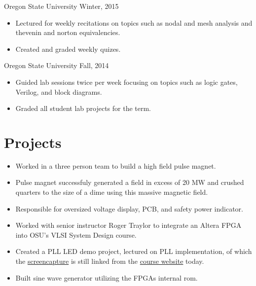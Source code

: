 \documentclass[]{friggeri-cv}
\begin{document}
         {Oregon State University}
         {Winter, 2015}
         \begin{itemize}
           \item Lectured for weekly recitations on topics such as nodal and mesh 
                 analysis and thevenin and norton equivalencies.
           \item Created and graded weekly quizes.
         \end{itemize}

         {Oregon State University}
         {Fall, 2014}
         \begin{itemize}
           \item Guided lab sessions twice per week focusing on topics such as logic
                 gates, Verilog, and block diagrams.
           \item Graded all student lab projects for the term.
         \end{itemize}



\section{Projects}  

         \begin{itemize}
           \item Worked in a three person team to build a high field pulse magnet.
           \item Pulse magnet successfuly generated a field in excess of 20 MW and 
                 crushed quarters to the size of a dime using this massive magnetic field.
           \item Responsible for oversized voltage display, PCB, and safety power indicator.
         \end{itemize} 
    

         \begin{itemize}
           \item Worked with senior instructor Roger Traylor to integrate an Altera FPGA 
                 into OSU's VLSI System Design course.
           \item Created a PLL LED demo project, lectured on PLL implementation, of which 
                 the 
                 \href{https://drive.google.com/file/d/0B_A8ZVw8vDrfZHMtQ0pHdFRmeWM/view}{screencapture} 
                 is still linked from the 
                 \href{http://classes.engr.oregonstate.edu/eecs/spring2016/ece474/}{course website} 
                today.
           \item Built sine wave generator utilizing the FPGAs internal rom.
         \end{itemize}
\end{document}
